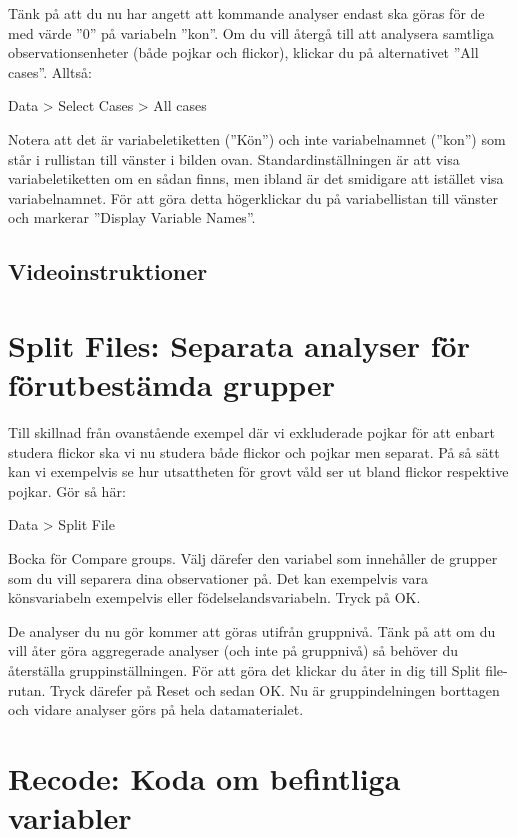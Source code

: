 \documentclass[
]{book}
\begin{document}
Tänk på att du nu har angett att kommande analyser endast ska göras för de med värde ''0'' på
variabeln ''kon''. Om du vill återgå till att analysera samtliga observationsenheter (både pojkar och
flickor), klickar du på alternativet ''All cases''. Alltså:

Data \textgreater{} Select Cases \textgreater{} All cases

Notera att det är variabeletiketten (''Kön'') och inte variabelnamnet (''kon'') som står i rullistan till
vänster i bilden ovan. Standardinställningen är att visa variabeletiketten om en sådan finns, men
ibland är det smidigare att istället visa variabelnamnet. För att göra detta högerklickar du på
variabellistan till vänster och markerar ''Display Variable Names''.

\hypertarget{videoinstruktioner}{%
\subsection{Videoinstruktioner}\label{videoinstruktioner}}

\hypertarget{split-files-separata-analyser-fuxf6r-fuxf6rutbestuxe4mda-grupper}{%
\section{Split Files: Separata analyser för förutbestämda grupper}\label{split-files-separata-analyser-fuxf6r-fuxf6rutbestuxe4mda-grupper}}

Till skillnad från ovanstående exempel där vi exkluderade pojkar för att enbart studera flickor ska vi nu studera både flickor och pojkar men separat. På så sätt kan vi exempelvis se hur utsattheten för grovt våld ser ut bland flickor respektive pojkar. Gör så här:

Data \textgreater{} Split File

Bocka för Compare groups. Välj därefer den variabel som innehåller de grupper som du vill separera dina observationer på. Det kan exempelvis vara könsvariabeln exempelvis eller födelselandsvariabeln. Tryck på OK.

De analyser du nu gör kommer att göras utifrån gruppnivå. Tänk på att om du vill åter göra aggregerade analyser (och inte på gruppnivå) så behöver du återställa gruppinställningen. För att göra det klickar du åter in dig till Split file-rutan. Tryck därefer på Reset och sedan OK. Nu är gruppindelningen borttagen och vidare analyser görs på hela datamaterialet.

\hypertarget{recode-koda-om-befintliga-variabler}{%
\section{Recode: Koda om befintliga variabler}\label{recode-koda-om-befintliga-variabler}}
\end{document}
